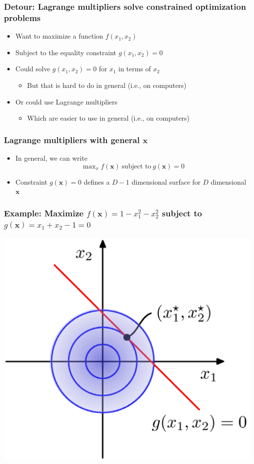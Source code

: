 \documentclass[12pt,notes,mathserif]{beamer}
\begin{document}
\begin{frame}[c]
\frametitle{Detour: Lagrange multipliers solve constrained optimization problems}
\begin{itemize}
\item Want to maximize a function $f(x_1,x_2)$
\item Subject to the equality constraint $g(x_1,x_2)= 0$
\item Could solve $g(x_1,x_2)= 0$ for $x_1$ in terms of $x_2$
\begin{itemize}
\item But that is hard to do in general (i.e., on computers)
\end{itemize}
\item Or could use Lagrange multipliers
\begin{itemize}
\item Which are easier to use in general (i.e., on computers)
\end{itemize}
\end{itemize}
\end{frame}


\begin{frame}[c]
\frametitle{Lagrange multipliers with general $\mathbf{x}$}
\begin{itemize}
\item In general, we can write
\[
\max\nolimits_x f(\mathbf{x})~\text{subject~to}~g(\mathbf{x})=0
\]
\item Constraint $g(\mathbf{x})= 0$ defines a $D− 1$ dimensional surface for $D$ dimensional $\mathbf{x}$
\end{itemize}
\end{frame}


\begin{frame}[c]
\frametitle{Example: Maximize $f(\mathbf{x})=1-x_1^2-x_2^2$ subject to $g(\mathbf{x})=x_1+x_2-1=0$}
\begin{center}
\includegraphics[width=0.7\linewidth]{fig8/lec826.jpg}
\end{center}
\end{frame}
\end{document}
